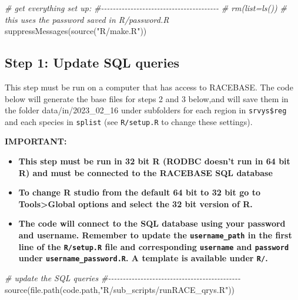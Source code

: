 \documentclass[
]{article}
\newenvironment{Shaded}{\begin{snugshade}}{\end{snugshade}}
\newcommand{\CommentTok}[1]{\textcolor[rgb]{0.56,0.35,0.01}{\textit{#1}}}
\newcommand{\FunctionTok}[1]{\textcolor[rgb]{0.00,0.00,0.00}{#1}}
\newcommand{\NormalTok}[1]{#1}
\newcommand{\StringTok}[1]{\textcolor[rgb]{0.31,0.60,0.02}{#1}}
\begin{document}
\begin{Shaded}
\begin{Highlighting}[]
  \CommentTok{\# get everything set up:}
  \CommentTok{\#{-}{-}{-}{-}{-}{-}{-}{-}{-}{-}{-}{-}{-}{-}{-}{-}{-}{-}{-}{-}{-}{-}{-}{-}{-}{-}{-}{-}{-}{-}{-}{-}{-}{-}{-}{-}{-}{-}{-}{-}}
    \CommentTok{\# rm(list=ls())}
    \CommentTok{\# this uses the password saved in R/password.R}
    \FunctionTok{suppressMessages}\NormalTok{(}\FunctionTok{source}\NormalTok{(}\StringTok{"R/make.R"}\NormalTok{))}
\end{Highlighting}
\end{Shaded}

\hypertarget{step-1-update-sql-queries}{%
\subsection{Step 1: Update SQL
queries}\label{step-1-update-sql-queries}}

This step must be run on a computer that has access to RACEBASE. The
code below will generate the base files for steps 2 and 3 below,and will
save them in the folder data/in/2023\_02\_16 under subfolders for each
region in \texttt{srvys\$reg} and each species in \texttt{splist} (see
\texttt{R/setup.R} to change these settings).

\textbf{IMPORTANT:}

\begin{itemize}
\item
  \textbf{This step must be run in 32 bit R (RODBC doesn't run in 64 bit
  R) and must be connected to the RACEBASE SQL database}
\item
  \textbf{To change R studio from the default 64 bit to 32 bit go to
  Tools\textgreater Global options and select the 32 bit version of R.}
\item
  \textbf{The code will connect to the SQL database using your password
  and username. Remember to update the \texttt{username\_path} in the
  first line of the \texttt{R/setup.R} file and corresponding
  \texttt{username} and \texttt{password} under
  \texttt{username\_password.R}. A template is available under
  \texttt{R/}.}
\end{itemize}

\begin{Shaded}
\begin{Highlighting}[]
  \CommentTok{\# update the SQL queries}
  \CommentTok{\#{-}{-}{-}{-}{-}{-}{-}{-}{-}{-}{-}{-}{-}{-}{-}{-}{-}{-}{-}{-}{-}{-}{-}{-}{-}{-}{-}{-}{-}{-}{-}{-}{-}{-}{-}{-}{-}{-}{-}{-}{-}{-}{-}{-}{-}  }
  \FunctionTok{source}\NormalTok{(}\FunctionTok{file.path}\NormalTok{(code.path,}\StringTok{"R/sub\_scripts/runRACE\_qrys.R"}\NormalTok{))}
\end{Highlighting}
\end{Shaded}
\end{document}
